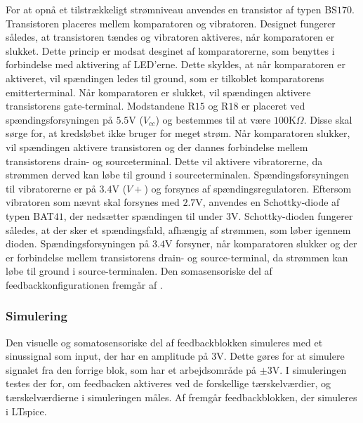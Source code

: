 For at opnå et tilstrækkeligt strømniveau anvendes en transistor af typen BS$170$. Transistoren placeres mellem komparatoren og vibratoren. Designet fungerer således, at transistoren tændes og vibratoren aktiveres, når komparatoren er slukket. Dette princip er modsat desginet af komparatorerne, som benyttes i forbindelse med aktivering af LED'erne. Dette skyldes, at når komparatoren er aktiveret, vil spændingen ledes til ground, som er tilkoblet komparatorens emitterterminal. Når komparatoren er slukket, vil spændingen aktivere transistorens gate-terminal. Modstandene R$15$ og R$18$ er placeret ved spændingsforsyningen på $5.5$V ($V_{cc}$) og bestemmes til at være $100$K$\Omega$. Disse skal sørge for, at kredsløbet ikke bruger for meget strøm. Når komparatoren slukker, vil spændingen aktivere transistoren og der dannes forbindelse mellem transistorens drain- og sourceterminal. Dette vil aktivere vibratorerne, da strømmen derved kan løbe til ground i sourceterminalen. Spændingsforsyningen til vibratorerne er på $3.4$V ($V+$) og forsynes af spændingsregulatoren. Eftersom vibratoren som nævnt skal forsynes med $2.7$V, anvendes en Schottky-diode af typen BAT$41$, der nedsætter spændingen til under $3$V. Schottky-dioden fungerer således, at der sker et spændingsfald, afhængig af strømmen, som løber igennem dioden. Spændingsforsyningen på $3.4$V forsyner, når komparatoren slukker og der er forbindelse mellem transistorens drain- og source-terminal, da strømmen kan løbe til ground i source-terminalen. Den somasensoriske del af feedbackkonfigurationen fremgår af .
 
\subsubsection{Simulering}\label{feedback_simulering}
Den visuelle og somatosensoriske del af feedbackblokken simuleres med et sinussignal som input, der har en amplitude på $3$V. Dette gøres for at simulere signalet fra den forrige blok, som har et arbejdsområde på $\pm3$V. I simuleringen testes der for, om feedbacken aktiveres ved de forskellige tærskelværdier, og tærskelværdierne i simuleringen måles.
Af  fremgår feedbackblokken, der simuleres i LTspice.

